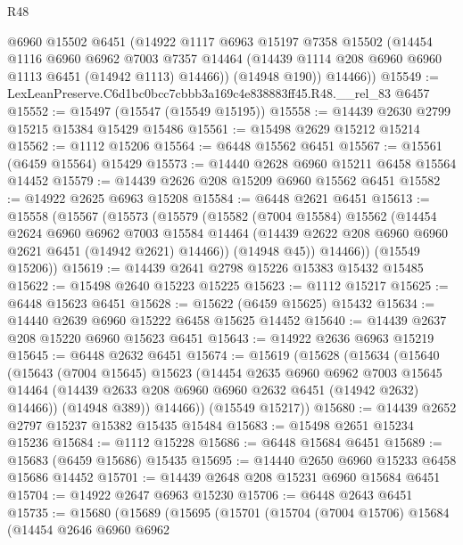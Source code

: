 \begin{lexlean}{R48}
\begin{coremodule}
        @6960
        @15502
        @6451
        (@14922
          @1117
          @6963
          @15197
          @7358
          @15502
          (@14454
            @1116
            @6960
            @6962
            @7003
            @7357
            @14464
            (@14439 @1114 @208 @6960 @6960 @1113 @6451 (@14942 @1113) @14466))
          (@14948 @190))
        @14466))
@15549 := LexLeanPreserve.C6d1bc0bcc7cbbb3a169c4e838883ff45.R48.__rel_83 @6457
@15552 := @15497 (@15547 (@15549 @15195))
@15558 := @14439 @2630 @2799 @15215 @15384 @15429 @15486
@15561 := @15498 @2629 @15212 @15214
@15562 := @1112 @15206
@15564 := @6448 @15562 @6451
@15567 := @15561 (@6459 @15564) @15429
@15573 := @14440 @2628 @6960 @15211 @6458 @15564 @14452
@15579 := @14439 @2626 @208 @15209 @6960 @15562 @6451
@15582 := @14922 @2625 @6963 @15208
@15584 := @6448 @2621 @6451
@15613 := @15558
    (@15567
      (@15573
        (@15579
          (@15582
            (@7004 @15584)
            @15562
            (@14454
              @2624
              @6960
              @6962
              @7003
              @15584
              @14464
              (@14439 @2622 @208 @6960 @6960 @2621 @6451 (@14942 @2621) @14466))
            (@14948 @45))
          @14466))
      (@15549 @15206))
@15619 := @14439 @2641 @2798 @15226 @15383 @15432 @15485
@15622 := @15498 @2640 @15223 @15225
@15623 := @1112 @15217
@15625 := @6448 @15623 @6451
@15628 := @15622 (@6459 @15625) @15432
@15634 := @14440 @2639 @6960 @15222 @6458 @15625 @14452
@15640 := @14439 @2637 @208 @15220 @6960 @15623 @6451
@15643 := @14922 @2636 @6963 @15219
@15645 := @6448 @2632 @6451
@15674 := @15619
    (@15628
      (@15634
        (@15640
          (@15643
            (@7004 @15645)
            @15623
            (@14454
              @2635
              @6960
              @6962
              @7003
              @15645
              @14464
              (@14439 @2633 @208 @6960 @6960 @2632 @6451 (@14942 @2632) @14466))
            (@14948 @389))
          @14466))
      (@15549 @15217))
@15680 := @14439 @2652 @2797 @15237 @15382 @15435 @15484
@15683 := @15498 @2651 @15234 @15236
@15684 := @1112 @15228
@15686 := @6448 @15684 @6451
@15689 := @15683 (@6459 @15686) @15435
@15695 := @14440 @2650 @6960 @15233 @6458 @15686 @14452
@15701 := @14439 @2648 @208 @15231 @6960 @15684 @6451
@15704 := @14922 @2647 @6963 @15230
@15706 := @6448 @2643 @6451
@15735 := @15680
    (@15689
      (@15695
        (@15701
          (@15704
            (@7004 @15706)
            @15684
            (@14454
              @2646
              @6960
              @6962

\end{coremodule}
\end{lexlean}
